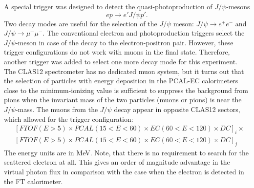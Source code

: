 A special trigger was designed to detect the quasi-photoproduction of $J/\psi$-mesons
$$
ep \to e' J/\psi p'.
$$
Two decay modes are useful for the selection of the $J/\psi$ meson: $J/\psi \to e^+e^-$ and $J/\psi \to \mu^+\mu^-$.
The conventional electron and photoproduction triggers  select the $J/\psi$-meson  in case of the decay to the electron-positron pair. However, these trigger configurations do not  work  with muons in the final state. Therefore, another trigger was added to select one more decay mode for this experiment. The CLAS12 spectrometer has no dedicated muon system, but it turns out that the selection of particles with energy deposition in the PCAL-EC calorimeters close to the minimum-ionizing  value is sufficient to suppress the background from pions when the invariant mass of the two particles (muons or pions) is near the $J/\psi$-mass. The muons from the $J/\psi$ decay appear in opposite CLAS12 sectors, which allowed for the trigger configuration:  
\begin{align*} 
 & [FTOF(E{{>}}5){\times}  PCAL(15{<}E{<}60){\times} EC(60{<}E{<}120){\times}   DC]_i {\times} \\
 & [FTOF(E{{>}}5){\times}  PCAL(15{<}E{<}60){\times} EC(60{<}E{<}120){\times}   DC]_j  
\end{align*}
\noindent
The energy units are in MeV. Note, that there is no requirement to search for the scattered electron at all. This gives an order of magnitude advantage in the  virtual photon flux in comparison with the case when the electron is detected in the FT calorimeter.
